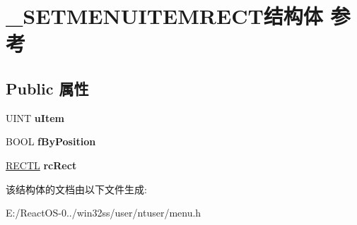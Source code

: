 \hypertarget{struct___s_e_t_m_e_n_u_i_t_e_m_r_e_c_t}{}\section{\+\_\+\+S\+E\+T\+M\+E\+N\+U\+I\+T\+E\+M\+R\+E\+C\+T结构体 参考}
\label{struct___s_e_t_m_e_n_u_i_t_e_m_r_e_c_t}
\subsection*{Public 属性}
\begin{DoxyCompactItemize}
\item 
\mbox{\label{struct___s_e_t_m_e_n_u_i_t_e_m_r_e_c_t_a5266eaa3b9deda093fbe75502780768e}} 
U\+I\+NT {\bfseries u\+Item}
\item 
\mbox{\label{struct___s_e_t_m_e_n_u_i_t_e_m_r_e_c_t_adb6411adc9ac6cd633a20f75628e3b80}} 
B\+O\+OL {\bfseries f\+By\+Position}
\item 
\mbox{\label{struct___s_e_t_m_e_n_u_i_t_e_m_r_e_c_t_a8a1678dfc5f1cb5b908a1361b635a958}} 
\hyperlink{struct___r_e_c_t_l}{R\+E\+C\+TL} {\bfseries rc\+Rect}
\end{DoxyCompactItemize}


该结构体的文档由以下文件生成\+:\begin{DoxyCompactItemize}
\item 
E\+:/\+React\+O\+S-\/0../win32ss/user/ntuser/menu.\+h\end{DoxyCompactItemize}
